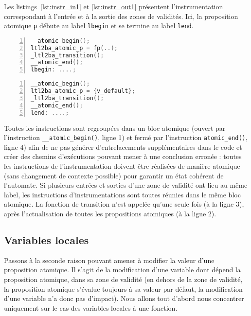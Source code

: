 Les listings~\ref{lst:instr_in1} et \ref{lst:instr_out1} présentent
l'instrumentation correspondant à l'entrée et à la sortie des zones de
validités. Ici, la proposition atomique \texttt{p} débute au label
\texttt{lbegin} et se termine au label \texttt{lend}.

\noindent\begin{minipage}{.47\textwidth}
  \begin{lstlisting}[language=C, frame=single, numbers=left, xleftmargin=1.6em,
    caption=Entrée d'une zone de validité (1),
    label=lst:instr_in1, xleftmargin=1.6em]
__atomic_begin();
ltl2ba_atomic_p = fp(..);
_ltl2ba_transition();
__atomic_end();
lbegin: ....;
\end{lstlisting}
\end{minipage}\hfill
\begin{minipage}{.47\textwidth}
  \begin{lstlisting}[language=C, frame=single, numbers=left,
    caption=Sortie d'une zone de validité (1),
    label=lst:instr_out1]
__atomic_begin();
ltl2ba_atomic_p = {v_default};
_ltl2ba_transition();
__atomic_end();
lend: ....;
\end{lstlisting}
\end{minipage}

Toutes les instructions sont regroupées dans un bloc atomique (ouvert
par l'instruction \texttt{\_\_atomic\_begin()}, ligne 1) et fermé par
l'instruction \texttt{atomic\_end()}, ligne 4) afin de ne pas générer
d'entrelacements supplémentaires dans le code et créer des chemins
d'exécutions pouvant mener à une conclusion erronée : toutes les
instructions de l'instrumentation doivent être réalisées de manière
atomique (sans changement de contexte possible) pour garantir un état
cohérent de l'automate. Si plusieurs entrées et sorties d'une zone de validité ont
lieu au même label, les instructions d'instrumentations sont toutes
réunies dans le même bloc atomique. La fonction de transition n'est
appelée qu'une seule fois (à la ligne 3), après l'actualisation de toutes les
propositions atomiques (à la ligne 2).

\subsection{Variables locales}

Passons à la seconde raison pouvant amener à modifier la valeur d'une
proposition atomique. Il s'agit de la modification d'une variable dont
dépend la proposition atomique, dans sa zone de validité (en dehors de
la zone de validité, la proposition atomique s'évalue toujours à sa
valeur par défaut, la modification d'une variable n'a donc pas
d'impact). Nous allons tout d'abord nous concentrer uniquement sur le
cas des variables locales à une fonction.


